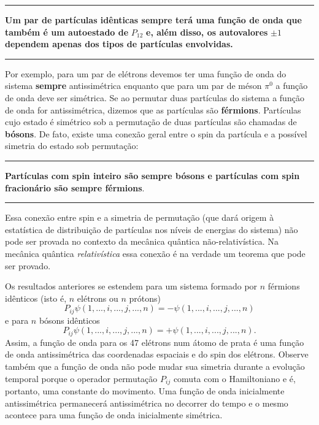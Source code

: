 \documentclass{article}
\begin{document}
\begin{center}

\noindent\rule{16cm}{0.4pt}

\textbf{Um par de partículas idênticas sempre terá uma função de onda que também é um autoestado de} $P_{12}$ \textbf{e, além disso, os autovalores} $\pm 1$ \textbf{dependem apenas dos tipos de partículas envolvidas.}

\noindent\rule{16cm}{0.4pt}

\end{center}
Por exemplo, para um par de elétrons devemos ter uma função de onda do sistema \textbf{sempre} antissimétrica enquanto que para um par de méson $\pi^0$ a função de onda deve ser simétrica. Se ao permutar duas partículas do sistema a função de onda for antissimétrica, dizemos que as partículas são \textbf{férmions}. Partículas cujo estado é simétrico sob a permutação de duas partículas são chamadas de \textbf{bósons}. De fato, existe uma conexão geral entre o spin da partícula e a possível simetria do estado sob permutação:

\begin{center}

\noindent\rule{16cm}{0.4pt}

 \textbf{Partículas com spin inteiro são sempre bósons e partículas com spin fracionário são sempre férmions}.

\noindent\rule{16cm}{0.4pt}

\end{center}
Essa conexão entre spin e a simetria de permutação (que dará origem à estatística de distribuição de partículas nos níveis de energias do sistema) não pode ser provada no contexto da mecânica quântica não-relativística. Na mecânica quântica \textit{relativística} essa conexão é na verdade um teorema que pode ser provado.

Os resultados anteriores se estendem para um sistema formado por $n$ férmions idênticos (isto é, $n$ elétrons ou $n$ prótons)
\begin{equation}
    P_{ij}\psi(1,...,i,...,j,...,n) = -\psi(1,...,i,...,j,...,n)
\end{equation}
e para $n$ bósons idênticos
\begin{equation}
    P_{ij}\psi(1,...,i,...,j,...,n) = +\psi(1,...,i,...,j,...,n).
\end{equation}
Assim, a função de onda para os 47 elétrons num átomo de prata é uma função de onda antissimétrica das coordenadas espaciais e do spin dos elétrons. Observe também que a função de onda não pode mudar sua simetria durante a evolução temporal porque o operador permutação $P_{ij}$ comuta com o Hamiltoniano e é, portanto, uma constante do movimento. Uma função de onda inicialmente antissimétrica permanecerá antissimétrica no decorrer do tempo e o mesmo acontece para uma função de onda inicialmente simétrica.
\end{document}
